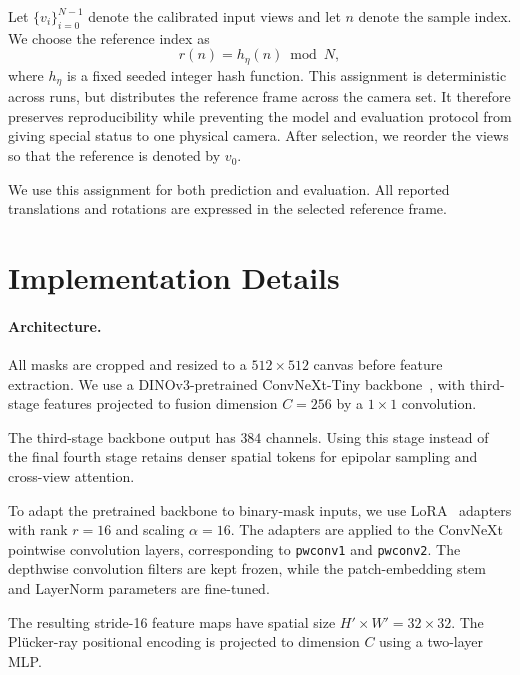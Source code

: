 Let \(\{v_i\}_{i=0}^{N-1}\) denote the calibrated input views and let \(n\)
denote the sample index. We choose the reference index as
\[
r(n) = h_{\eta}(n) \bmod N ,
\]
where \(h_{\eta}\) is a fixed seeded integer hash function. This assignment
is deterministic across runs, but distributes the reference frame across
the camera set. It therefore preserves reproducibility while preventing the
model and evaluation protocol from giving special status to one physical
camera. After selection, we reorder the views so that the reference is
denoted by \(v_0\).

We use this assignment for both prediction and evaluation. All reported
translations and rotations are expressed in the selected reference frame.

\section{Implementation Details}
\label{sec:implementation}

\paragraph{Architecture.}
All masks are cropped and resized to a \(512\times512\) canvas before feature extraction.
We use a DINOv3-pretrained ConvNeXt-Tiny backbone~\cite{simeoni2025dinov3,liu2022convnext}, with third-stage features projected to fusion dimension \(C=256\) by a \(1\times1\) convolution.

\label{supp:architecture}

The third-stage backbone output has \(384\) channels.
Using this stage instead of the final fourth stage retains denser
spatial tokens for epipolar sampling and cross-view attention.

To adapt the pretrained backbone to binary-mask inputs, we use
LoRA~\cite{hu2022lora} adapters with rank \(r=16\) and scaling
\(\alpha=16\).
The adapters are applied to the ConvNeXt pointwise convolution layers,
corresponding to \texttt{pwconv1} and \texttt{pwconv2}.
The depthwise convolution filters are kept frozen, while the
patch-embedding stem and LayerNorm parameters are fine-tuned.

The resulting stride-16 feature maps have spatial size \(H'\times W'=32\times32\).
The Pl\"ucker-ray positional encoding is projected to dimension \(C\) using a two-layer MLP.


